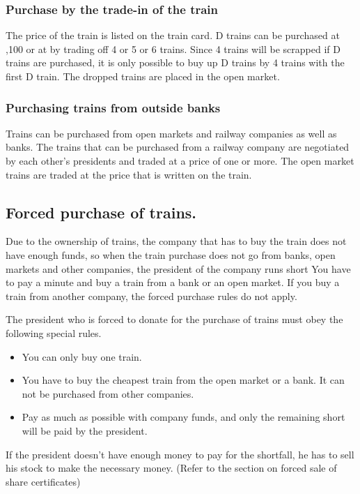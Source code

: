 \documentclass{article}
\begin{document}
\begin{CJK}{UTF8}{min}
\subsubsection{Purchase by the trade-in of the train}

The price of the train is listed on the train card. D trains can be
purchased at ,100 or at  by trading off 4 or 5 or
6 trains. Since 4 trains will be scrapped if D trains are purchased,
it is only possible to buy up D trains by 4 trains with the first D
train. The dropped trains are placed in the open market.

\subsubsection{Purchasing trains from outside banks}

Trains can be purchased from open markets and railway companies as
well as banks. The trains that can be purchased from a railway company
are negotiated by each other's presidents and traded at a price of one
or more. The open market trains are traded at the price that is
written on the train.

\subsection{Forced purchase of trains.}

Due to the ownership of trains, the company that has to buy the train
does not have enough funds, so when the train purchase does not go
from banks, open markets and other companies, the president of the
company runs short You have to pay a minute and buy a train from a
bank or an open market. If you buy a train from another company, the
forced purchase rules do not apply.

The president who is forced to donate for the purchase of trains must
obey the following special rules.
\begin{itemize}
\item You can only buy one train.
\item You have to buy the cheapest train from the open market or a
  bank. It can not be purchased from other companies.
\item Pay as much as possible with company funds, and only the
  remaining short will be paid by the president.
\end{itemize}
If the president doesn't have enough money to pay for the shortfall,
he has to sell his stock to make the necessary money. (Refer to the
section on forced sale of share certificates)


\end{CJK}
\end{document}
